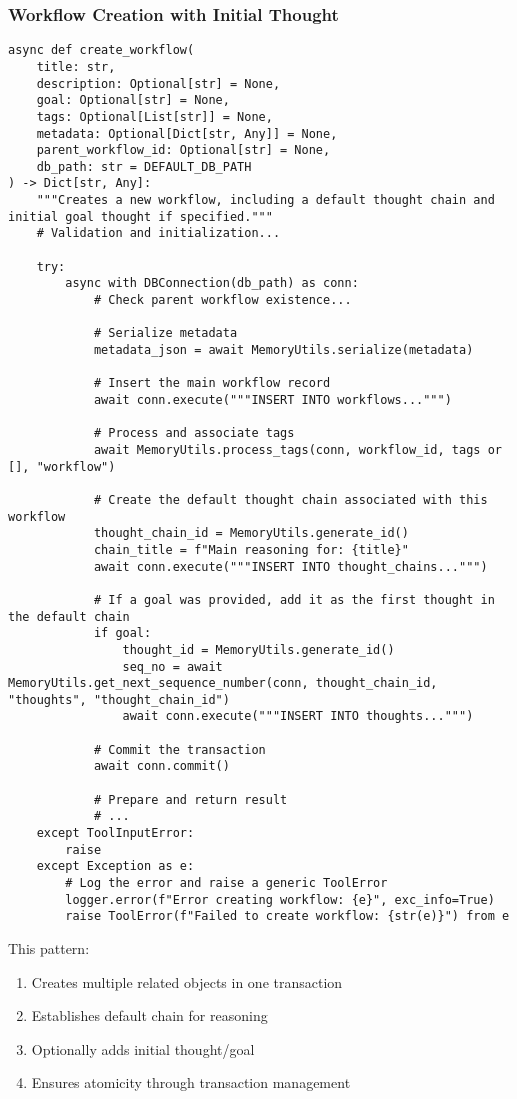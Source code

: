 \documentclass[12pt,a4paper]{article}
\begin{document}
\subsubsection*{Workflow Creation with Initial Thought}
\begin{pageablecode}
\begin{verbatim}
async def create_workflow(
    title: str,
    description: Optional[str] = None,
    goal: Optional[str] = None,
    tags: Optional[List[str]] = None,
    metadata: Optional[Dict[str, Any]] = None,
    parent_workflow_id: Optional[str] = None,
    db_path: str = DEFAULT_DB_PATH
) -> Dict[str, Any]:
    """Creates a new workflow, including a default thought chain and initial goal thought if specified."""
    # Validation and initialization...

    try:
        async with DBConnection(db_path) as conn:
            # Check parent workflow existence...

            # Serialize metadata
            metadata_json = await MemoryUtils.serialize(metadata)

            # Insert the main workflow record
            await conn.execute("""INSERT INTO workflows...""")

            # Process and associate tags
            await MemoryUtils.process_tags(conn, workflow_id, tags or [], "workflow")

            # Create the default thought chain associated with this workflow
            thought_chain_id = MemoryUtils.generate_id()
            chain_title = f"Main reasoning for: {title}"
            await conn.execute("""INSERT INTO thought_chains...""")

            # If a goal was provided, add it as the first thought in the default chain
            if goal:
                thought_id = MemoryUtils.generate_id()
                seq_no = await MemoryUtils.get_next_sequence_number(conn, thought_chain_id, "thoughts", "thought_chain_id")
                await conn.execute("""INSERT INTO thoughts...""")

            # Commit the transaction
            await conn.commit()

            # Prepare and return result
            # ...
    except ToolInputError:
        raise
    except Exception as e:
        # Log the error and raise a generic ToolError
        logger.error(f"Error creating workflow: {e}", exc_info=True)
        raise ToolError(f"Failed to create workflow: {str(e)}") from e
\end{verbatim}
\end{pageablecode}
This pattern:
\begin{enumerate}[label=\arabic*.]
    \item Creates multiple related objects in one transaction
    \item Establishes default chain for reasoning
    \item Optionally adds initial thought/goal
    \item Ensures atomicity through transaction management
\end{enumerate}
\end{document}
